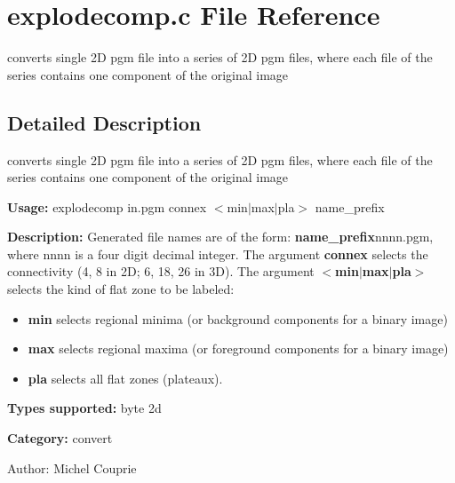 \section{explodecomp.c File Reference}
\label{explodecomp_8c}
converts single 2D pgm file into a series of 2D pgm files, where each file of the series contains one component of the original image  




\label{_details}
\subsection{Detailed Description}
converts single 2D pgm file into a series of 2D pgm files, where each file of the series contains one component of the original image 

{\bf Usage:} explodecomp in.pgm connex $<$min$|$max$|$pla$>$ name\_\-prefix

{\bf Description:} Generated file names are of the form: {\bf name\_\-prefix}nnnn.pgm, where nnnn is a four digit decimal integer. The argument {\bf connex} selects the connectivity (4, 8 in 2D; 6, 18, 26 in 3D). The argument {\bf $<$min$|$max$|$pla$>$} selects the kind of flat zone to be labeled: \begin{itemize}
\item {\bf min} selects regional minima (or background components for a binary image) \item {\bf max} selects regional maxima (or foreground components for a binary image) \item {\bf pla} selects all flat zones (plateaux).\end{itemize}
{\bf Types supported:} byte 2d

{\bf Category:} convert

\begin{Desc}
\item[Author:]Michel Couprie \end{Desc}
